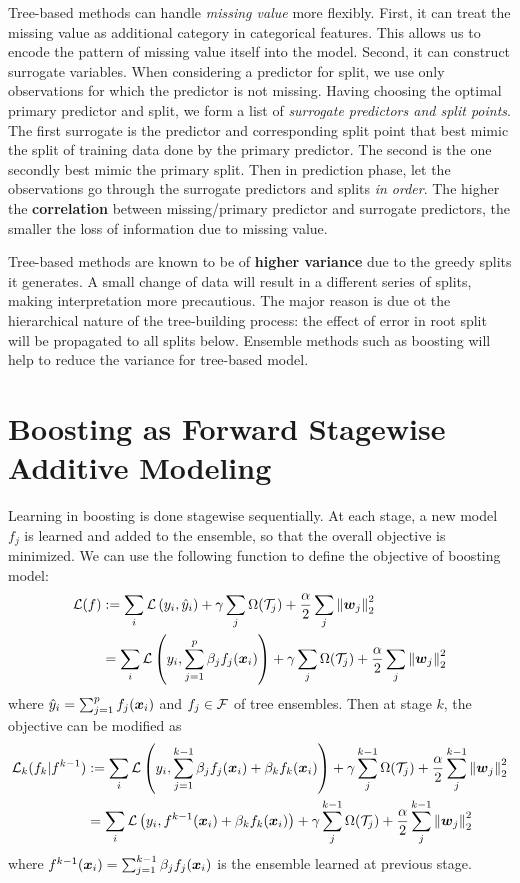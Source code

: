 \documentclass[11pt]{article}
\begin{document}
Tree-based methods can handle \emph{missing value} more flexibly. First, it can treat the missing value as additional category in categorical features. This allows us to encode the pattern of missing value itself into the model. Second, it can construct surrogate variables. When considering a predictor for split, we use only observations for which the predictor is not missing. Having choosing the optimal primary predictor and split, we form a list of \emph{surrogate predictors and split points}. The first surrogate is the predictor and corresponding split point that best mimic the split of training data done by the primary predictor. The second is the one secondly best mimic the primary split. Then in prediction phase, let the observations go through the surrogate predictors and splits \emph{in order}. The higher the \textbf{correlation} between missing/primary predictor and surrogate predictors, the smaller the loss of information due to missing value. 

Tree-based methods are known to be of \textbf{higher variance} due to the greedy splits it generates. A small change of data will result in a  different series of splits, making interpretation more precautious. The major reason is due ot the hierarchical nature of the tree-building process: the effect of error in root split will be propagated to all splits below.  Ensemble methods such as boosting will help to reduce the variance for tree-based model. 


\section{Boosting as Forward Stagewise Additive Modeling}
Learning in boosting is done stagewise sequentially. At each stage, a new model $f_{j}$ is learned and added to the ensemble, so that the overall objective is minimized. We can use the following function to define the objective of boosting model:
 \begin{align*}
{\mathcal L}(f) &:= \sum_{i}{\mathcal L}\left(y_i, \hat{y}_{i}\right) +\gamma  \sum_{j}\Omega({\mathcal T}_{j}) + \frac{\alpha}{2} \sum_{j}\left\|\boldsymbol{w}_{j}\right\|_{2}^{2} \\
&= \sum_{i}{\mathcal L}\left(y_i,  \sum_{j=1}^{p}\beta_{j}f_j(\boldsymbol{x}_{i})\right)  +\gamma  \sum_{j}\Omega({\mathcal T}_{j}) + \frac{\alpha}{2} \sum_{j}\left\|\boldsymbol{w}_{j}\right\|_{2}^{2}
\end{align*} where $ \hat{y}_{i} = \sum_{j=1}^{p}f_j(\boldsymbol{x}_{i})$ and $f_{j} \in {\mathcal F}$ of tree ensembles. Then at stage $k$, the objective can be modified as 
 \begin{align}
{\mathcal L}_{k}(f_{k} | f^{k-1}) &:= \sum_{i}{\mathcal L}\left(y_i,  \sum_{j=1}^{k-1}\beta_{j}f_j(\boldsymbol{x}_{i}) + \beta_{k}f_{k}(\boldsymbol{x}_{i})\right)  +\gamma  \sum_{j}^{k-1}\Omega({\mathcal T}_{j}) + \frac{\alpha}{2} \sum_{j}^{k-1}\left\|\boldsymbol{w}_{j}\right\|_{2}^{2} \nonumber\\
&= \sum_{i}{\mathcal L}\left(y_i, f^{k-1}(\boldsymbol{x}_{i}) +\beta_{k} f_{k}(\boldsymbol{x}_{i})\right)  +\gamma  \sum_{j}^{k-1}\Omega({\mathcal T}_{j}) + \frac{\alpha}{2} \sum_{j}^{k-1}\left\|\boldsymbol{w}_{j}\right\|_{2}^{2} \label{eqn: forward_objective}
\end{align} where $f^{k-1}(\boldsymbol{x}_{i}) = \sum_{j=1}^{k-1}\beta_{j}f_j(\boldsymbol{x}_{i})$ is the ensemble learned at previous stage.
\end{document}
